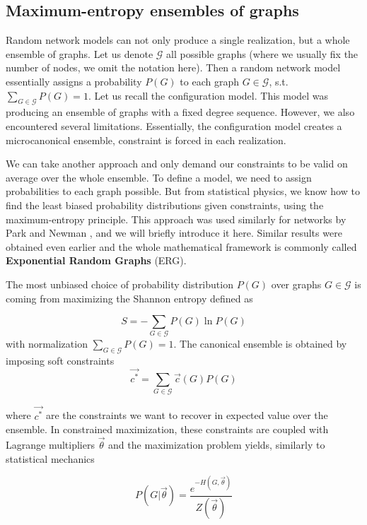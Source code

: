 \subsection{Maximum-entropy ensembles of graphs}
\label{sec_max_ent_ensembles}
Random network models can not only produce a single realization, but a whole ensemble of graphs. Let us denote $\mathcal{G}$ all possible graphs (where we usually fix the number of nodes, we omit the notation here). Then a random network model essentially assigns a probability $P(G)$ to each graph $G \in \mathcal{G}$, s.t. $\sum_{G \in \mathcal{G}}P(G) = 1$. Let us recall the configuration model. This model was producing an ensemble of graphs with a fixed degree sequence. However, we also encountered several limitations. Essentially, the configuration model creates a microcanonical ensemble, constraint is forced in each realization. 

We can take another approach and only demand our constraints to be valid on average over the whole ensemble. To define a model, we need to assign probabilities to each graph possible. But from statistical physics, we know how to find the least biased probability distributions given constraints, using the maximum-entropy principle. This approach was used similarly for networks by Park and Newman \cite{Park2004}, and we will briefly introduce it here. Similar results were obtained even earlier and the whole mathematical framework is commonly called \textbf{Exponential Random Graphs} (ERG).

The most unbiased choice of probability distribution $P(G)$ over graphs $G \in \mathcal{G}$ is coming from maximizing the Shannon entropy defined as

\begin{equation}
    S = -\sum_{G \in \mathcal{G}}P(G) \ln P(G)
\end{equation}
with normalization $\sum_{G \in \mathcal{G}}P(G) = 1$. The canonical ensemble is obtained by imposing soft constraints
\begin{equation}
    \vec{c^*} = \sum_{G \in \mathcal{G}} \vec{c}(G)P(G)
\end{equation}

where $\vec{c^*}$ are the constraints we want to recover in expected value over the ensemble. In constrained maximization, these constraints are coupled with Lagrange multipliers $\vec{\theta}$ and the maximization problem yields, similarly to statistical mechanics

\begin{equation}
    P(G|\vec{\theta}) = \frac{e^{-H(G,\vec{\theta})}}{Z(\vec{\theta})}
\end{equation}

